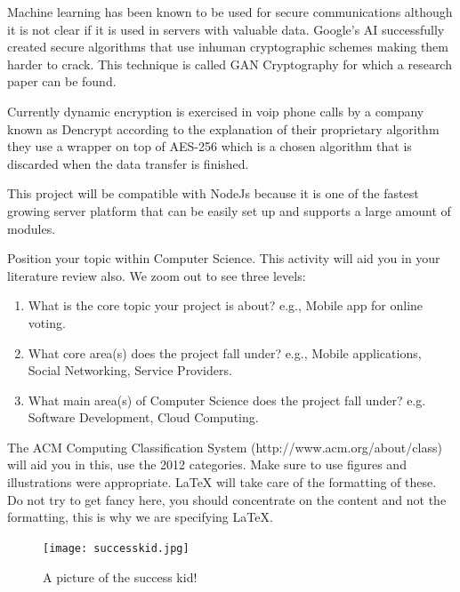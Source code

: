 %
%
%
%






%
%
%
%
Machine learning has been known to be used for secure communications although it is not clear if it is used in servers with valuable data. Google's AI successfully created secure algorithms \cite{GoogleAi1} that use inhuman cryptographic schemes making them harder to crack. This technique is called GAN Cryptography \cite{GoogleAi2} for which a research paper can be found.

Currently dynamic encryption is exercised in voip phone calls by a company known as Dencrypt \cite{dencrypt} according to the explanation of their proprietary algorithm they use a wrapper on top of AES-256 which is a chosen algorithm that is discarded when the data transfer is finished.


This project will be compatible with NodeJs because it is one of the fastest growing server platform \cite{NodeJs} that can be easily set up and supports a large amount of modules.

%
%
%
%

%
%
%
%
Position your topic within Computer Science. This activity will aid you in your literature review also. We zoom out to see three levels:

\begin{enumerate}
    \item What is the core topic your project is about? e.g., Mobile app for online voting.
    \item What core area(s) does the project fall under? e.g., Mobile applications, Social Networking, Service Providers. 
    \item What main area(s) of Computer Science does the project fall under? e.g. Software Development, Cloud Computing.
\end{enumerate}

The ACM Computing Classification System (http://www.acm.org/about/class) will aid you in this, use the 2012 categories. Make sure to use figures and illustrations were appropriate. LaTeX will take care of the formatting of these. Do not try to get fancy here, you should concentrate on the content and not the formatting, this is why we are specifying LaTeX.

\begin{figure}[ht]
  \centering
      \texttt{[image: successkid.jpg]}
  \caption[A picture of the success kid!]{A picture of the success kid!\cite{Reference1}}
  \label{fig:successkid}
\end{figure}

